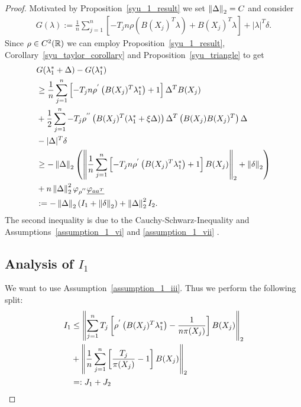 \begin{proof}
  Motivated by Proposition~\ref{syu_1_result}
  we set
  $\left\lVert\Delta\right\rVert_2 = C$ 
  and consider
 \begin{gather}
   G(\lambda)
   :=
      \frac{1}{n}
      \sum_{j = 1}^{n} 
      \left[ 
        -T_j n 
        \rho 
        \left( 
          B(X_j)^T \lambda
        \right)
      +
      B(X_j)^T \lambda
      \right]
      +
      |\lambda|^T \delta.
 \end{gather} 
 Since 
 $\rho \in C^2(\mathbb{R})$
 we can employ 
 Proposition~\ref{syu_1_result},
 Corollary~\ref{syu_taylor_corollary}
 and
 Proposition~\ref{syu_triangle}
 to get
 \begin{align}
  \begin{split}
  & 
  G(\lambda^*_1 + \Delta) 
  -
  G(\lambda^*_1)
  \\
  &\ge
      \frac{1}{n}
      \sum_{j = 1}^{n} 
      \left[ 
        -T_j n 
        \rho^{'} 
        \left( 
          B(X_j)^T \lambda^*_1
        \right)
      +
      1
      \right]
      \Delta^T B(X_j)
      \\
  & +
      \frac{1}{2}
      \sum_{j = 1}^{n} 
        -T_j  
        \rho^{''} 
        \left( 
          B(X_j)^T (\lambda^*_1 + \xi \Delta)
        \right)
        \Delta^T
        \left( 
          B(X_j)
          B(X_j)^T
        \right)
        \Delta
        \\
  &-
      |\Delta|^T \delta
  \\
  &\ge
    - \left\lVert\Delta\right\rVert_2
    \left( 
    \left\lVert
      \frac{1}{n}
      \sum_{j = 1}^{n} 
      \left[ 
        -T_j n 
        \rho^{'} 
        \left( 
          B(X_j)^T \lambda^*_1
        \right)
      +
      1
      \right]
      B(X_j)
    \right\rVert_2
    +
    \left\lVert\delta\right\rVert_2
    \right)
    \\
  &+
  n
  \left\lVert\Delta\right\rVert^2_2
   \varphi_{\rho^{''}}
  \underline{\varphi_{aa^T}}
  \\
  &:=
  -\left\lVert\Delta\right\rVert_2
  (I_1 + \left\lVert\delta\right\rVert_2)
  +
  \left\lVert\Delta\right\rVert^2_2
  I_2
  .
  \end{split}
\end{align}
The second inequality is due to 
the Cauchy-Schwarz-Inequality 
and
Assumptions~\ref{assumption_1_vi} and \ref{assumption_1_vii}
.
\subsection*{Analysis of $I_1$}
We want to use Assumption~\ref{assumption_1_iii}.
Thus we perform the following split:
\begin{align}
  I_1 
  &\le
    \left\lVert
      \sum_{j = 1}^{n} 
        T_j  
      \left[ 
        \rho^{'} 
        \left( 
          B(X_j)^T \lambda^*_1
        \right)
      -
      \frac{1}{n \pi(X_j)}
      \right]
      B(X_j)
    \right\rVert_2
  \\
  &+
    \left\lVert
      \frac{1}{n}
      \sum_{j = 1}^{n} 
      \left[ 
        \frac{T_j}{\pi(X_j)}
      -
      1
      \right]
      B(X_j)
    \right\rVert_2
    \\
  &=:
  J_1 + J_2
\end{align}


\end{proof}
